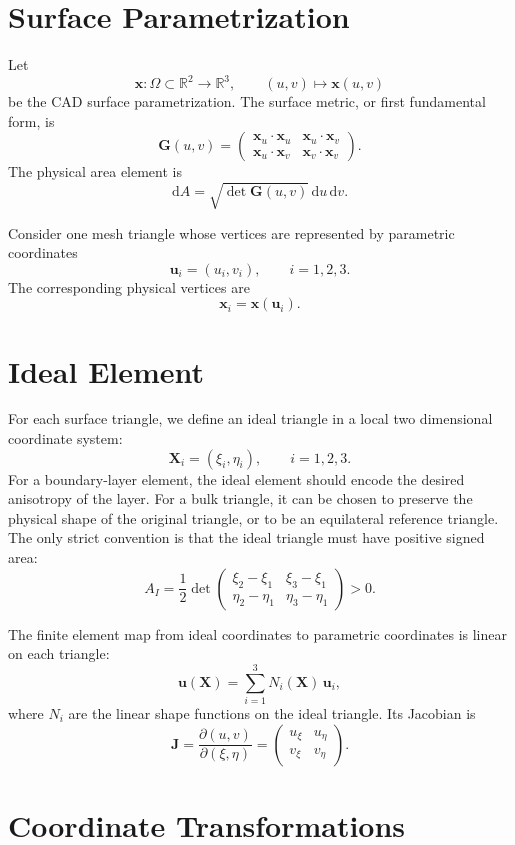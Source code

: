 \documentclass[11pt]{article}
\newcommand{\R}{\mathbb{R}}
\newcommand{\dd}{\mathrm{d}}
\newcommand{\bx}{\bm{x}}
\newcommand{\bu}{\bm{u}}
\newcommand{\bX}{\bm{X}}
\newcommand{\bG}{\bm{G}}
\newcommand{\bJ}{\bm{J}}
\begin{document}
\section{Surface Parametrization}

Let
\[
  \bx : \Omega \subset \R^2 \rightarrow \R^3,
  \qquad
  (u,v) \mapsto \bx(u,v)
\]
be the CAD surface parametrization. The surface metric, or first fundamental
form, is
\[
  \bG(u,v) =
  \begin{pmatrix}
    \bx_u \cdot \bx_u & \bx_u \cdot \bx_v \\
    \bx_u \cdot \bx_v & \bx_v \cdot \bx_v
  \end{pmatrix}.
\]
The physical area element is
\[
  \dd A = \sqrt{\det \bG(u,v)}\,\dd u\,\dd v.
\]

Consider one mesh triangle whose vertices are represented by parametric
coordinates
\[
  \bu_i = (u_i,v_i), \qquad i=1,2,3.
\]
The corresponding physical vertices are
\[
  \bx_i = \bx(\bu_i).
\]

\section{Ideal Element}

For each surface triangle, we define an ideal triangle in a local two
dimensional coordinate system:
\[
  \bX_i = (\xi_i,\eta_i), \qquad i=1,2,3.
\]
For a boundary-layer element, the ideal element should encode the desired
anisotropy of the layer. For a bulk triangle, it can be chosen to preserve the
physical shape of the original triangle, or to be an equilateral reference
triangle. The only strict convention is that the ideal triangle must have
positive signed area:
\[
  A_I =
  \frac{1}{2}
  \det
  \begin{pmatrix}
    \xi_2-\xi_1 & \xi_3-\xi_1 \\
    \eta_2-\eta_1 & \eta_3-\eta_1
  \end{pmatrix}
  > 0.
\]

The finite element map from ideal coordinates to parametric coordinates is
linear on each triangle:
\[
  \bu(\bX) =
  \sum_{i=1}^3 N_i(\bX)\,\bu_i,
\]
where \(N_i\) are the linear shape functions on the ideal triangle. Its
Jacobian is
\[
  \bJ =
  \frac{\partial (u,v)}{\partial(\xi,\eta)}
  =
  \begin{pmatrix}
    u_\xi & u_\eta \\
    v_\xi & v_\eta
  \end{pmatrix}.
\]

\section{Coordinate Transformations}
\end{document}

